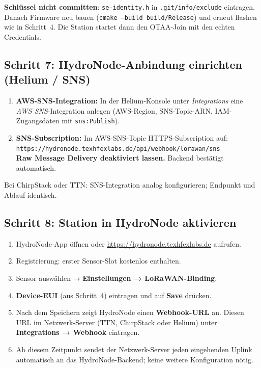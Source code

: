 \documentclass[11pt,a4paper]{scrartcl}
\begin{document}
\textbf{Schlüssel nicht committen}: \texttt{se-identity.h} in \texttt{.git/info/exclude} eintragen. Danach Firmware neu bauen (\texttt{cmake --build build/Release}) und erneut flashen wie in Schritt~4. Die Station startet dann den OTAA-Join mit den echten Credentials.

\subsection*{Schritt 7: HydroNode-Anbindung einrichten (Helium / SNS)}

\begin{enumerate}
  \item \textbf{AWS-SNS-Integration:} In der Helium-Konsole unter \textit{Integrations} eine \textit{AWS SNS}-Integration anlegen (AWS-Region, SNS-Topic-ARN, IAM-Zugangsdaten mit \texttt{sns:Publish}).
  \item \textbf{SNS-Subscription:} Im AWS-SNS-Topic HTTPS-Subscription auf:\\
        \texttt{https://hydronode.texhfexlabs.de/api/webhook/lorawan/sns}\\
        \textbf{Raw Message Delivery deaktiviert lassen.} Backend bestätigt automatisch.
\end{enumerate}

Bei ChirpStack oder TTN: SNS-Integration analog konfigurieren; Endpunkt und Ablauf identisch.

\subsection*{Schritt 8: Station in HydroNode aktivieren}

\begin{enumerate}
  \item HydroNode-App öffnen oder \url{https://hydronode.texhfexlabs.de} aufrufen.
  \item Registrierung: erster Sensor-Slot kostenlos enthalten.
  \item Sensor auswählen → \textbf{Einstellungen → LoRaWAN-Binding}.
  \item \textbf{Device-EUI} (aus Schritt~4) eintragen und auf \textbf{Save} drücken.
  \item Nach dem Speichern zeigt HydroNode einen \textbf{Webhook-URL} an. Diesen URL im Netzwerk-Server (TTN, ChirpStack oder Helium) unter \textbf{Integrations → Webhook} eintragen.
  \item Ab diesem Zeitpunkt sendet der Netzwerk-Server jeden eingehenden Uplink automatisch an das HydroNode-Backend; keine weitere Konfiguration nötig.
\end{enumerate}
\end{document}
